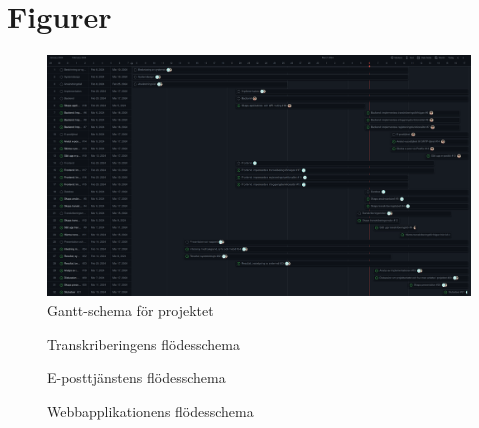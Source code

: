\chapter{Figurer}

\begin{figure}[h]
  \centering
  \includegraphics[width=1\textwidth]{images/gantt}
  \caption{Gantt-schema för projektet}
  \label{fig:gantt}
\end{figure}

\begin{figure}[h]
  \centering
  
  \caption{Transkriberingens flödesschema}
  \label{fig:transcription-flowchart}
\end{figure}

\begin{figure}[h]
  \centering
  
  \caption{E-posttjänstens flödesschema}
  \label{fig:email-flowchart}
\end{figure}

\begin{figure}[h]
  \centering
  
  \caption{Webbapplikationens flödesschema}
  \label{fig:system-flowchart}
\end{figure}

